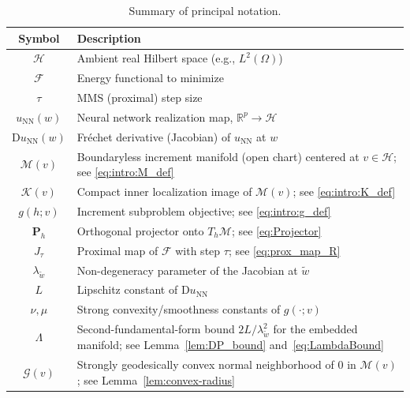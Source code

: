 \documentclass[twoside,11pt]{article}
\newcommand{\rev}[1]{#1}                           %
\newcommand{\R}{\mathbb{R}}
\renewcommand{\P}{\mathbf{P}}
\newcommand{\D}{\mathrm{D}}
\newcommand{\NN}{\mathrm{NN}}
\newcommand{\calF}{\mathcal{F}}
\newcommand{\calG}{\mathcal{G}}
\newcommand{\calH}{\mathcal{H}}
\newcommand{\calK}{\mathcal{K}}
\newcommand{\calM}{\mathcal{M}}
\begin{document}
\rev{%
\begin{table}[h]
\centering
\caption{Summary of principal notation.}
\label{tab:notation}
\begin{tabular}{cl}
\hline
Symbol & Description \\
\hline
$\calH$ & Ambient real Hilbert space (e.g., $L^2(\Omega)$) \\
$\calF$ & Energy functional to minimize \\
$\tau$ & MMS (proximal) step size \\
$u_{\NN}(w)$ & Neural network realization map, $\R^p\to\calH$ \\
$\D u_{\NN}(w)$ & Fr\'echet derivative (Jacobian) of $u_{\NN}$ at $w$ \\
$\calM(v)$ & Boundaryless increment manifold (open chart) centered at $v\in\calH$; see \eqref{eq:intro:M_def} \\
$\calK(v)$ & Compact inner localization image of $\calM(v)$; see \eqref{eq:intro:K_def} \\
$g(h;v)$ & Increment subproblem objective; see \eqref{eq:intro:g_def} \\
$\P_h$ & Orthogonal projector onto $T_h\calM$; see \eqref{eq:Projector} \\
$J_\tau$ & Proximal map of $\calF$ with step $\tau$; see \eqref{eq:prox_map_R} \\
$\lambda_{\tilde w}$ & Non-degeneracy parameter of the Jacobian at $\tilde w$ \\
$L$ & Lipschitz constant of $\D u_{\NN}$ \\
$\nu,\mu$ & Strong convexity/smoothness constants of $g(\cdot;v)$ \\
$\Lambda$ & Second-fundamental-form bound $2L/\lambda_{\tilde w}^2$ for the embedded manifold; see Lemma~\ref{lem:DP_bound} and~\eqref{eq:LambdaBound} \\
$\calG(v)$ & Strongly geodesically convex normal neighborhood of $0$ in $\calM(v)$; see Lemma~\ref{lem:convex-radius} \\
\hline
\end{tabular}
\end{table}
}
\end{document}
